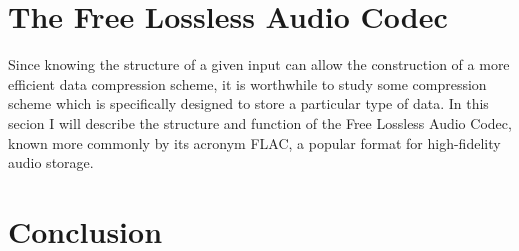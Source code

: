 \documentclass[12pt]{article}
\begin{document}
\section{The Free Lossless Audio Codec}

Since knowing the structure of a given input can allow the
construction of a more efficient data compression scheme, it is
worthwhile to study some compression scheme which is specifically
designed to store a particular type of data. In this secion I will
describe the structure and function of the Free Lossless Audio Codec,
known more commonly by its acronym FLAC, a popular format for
high-fidelity audio storage.

\section{Conclusion}





\end{document}

